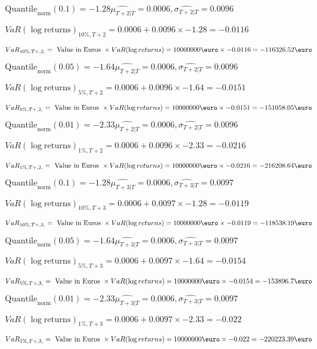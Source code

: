 $\text{Quantile}_\text{norm}(0.1) = -1.28$$\hat{\mu_{T+2|T}} = 0.0006, \hat{\sigma_{T+2|T}} = 0.0096$

$VaR(\log \text{returns})_{10\%, T + 2} = 0.0006 + 0.0096\times-1.28 = -0.0116$

$VaR_{10\%, T + ,2,} = \text{ Value in Euros } \times VaR(\log returns) = 10 000 000 \text{\euro} \times-0.0116 = -116326.52 \text{\euro}$


$\text{Quantile}_\text{norm}(0.05) = -1.64$$\hat{\mu_{T+2|T}} = 0.0006, \hat{\sigma_{T+2|T}} = 0.0096$

$VaR(\log \text{returns})_{5\%, T + 2} = 0.0006 + 0.0096\times-1.64 = -0.0151$

$VaR_{5\%, T + ,2,} = \text{ Value in Euros } \times VaR(\log returns) = 10 000 000 \text{\euro} \times-0.0151 = -151058.05 \text{\euro}$


$\text{Quantile}_\text{norm}(0.01) = -2.33$$\hat{\mu_{T+2|T}} = 0.0006, \hat{\sigma_{T+2|T}} = 0.0096$

$VaR(\log \text{returns})_{1\%, T + 2} = 0.0006 + 0.0096\times-2.33 = -0.0216$

$VaR_{1\%, T + ,2,} = \text{ Value in Euros } \times VaR(\log returns) = 10 000 000 \text{\euro} \times-0.0216 = -216208.64 \text{\euro}$


$\text{Quantile}_\text{norm}(0.1) = -1.28$$\hat{\mu_{T+3|T}} = 0.0006, \hat{\sigma_{T+3|T}} = 0.0097$

$VaR(\log \text{returns})_{10\%, T + 3} = 0.0006 + 0.0097\times-1.28 = -0.0119$

$VaR_{10\%, T + ,3,} = \text{ Value in Euros } \times VaR(\log returns) = 10 000 000 \text{\euro} \times-0.0119 = -118538.19 \text{\euro}$


$\text{Quantile}_\text{norm}(0.05) = -1.64$$\hat{\mu_{T+3|T}} = 0.0006, \hat{\sigma_{T+3|T}} = 0.0097$

$VaR(\log \text{returns})_{5\%, T + 3} = 0.0006 + 0.0097\times-1.64 = -0.0154$

$VaR_{5\%, T + ,3,} = \text{ Value in Euros } \times VaR(\log returns) = 10 000 000 \text{\euro} \times-0.0154 = -153896.7 \text{\euro}$


$\text{Quantile}_\text{norm}(0.01) = -2.33$$\hat{\mu_{T+3|T}} = 0.0006, \hat{\sigma_{T+3|T}} = 0.0097$

$VaR(\log \text{returns})_{1\%, T + 3} = 0.0006 + 0.0097\times-2.33 = -0.022$

$VaR_{1\%, T + ,3,} = \text{ Value in Euros } \times VaR(\log returns) = 10 000 000 \text{\euro} \times-0.022 = -220223.39 \text{\euro}$


